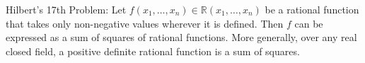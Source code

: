 Hilbert's 17th Problem: Let $f(x_1, \ldots, x_n) \in \mathbb{R}(x_1, \ldots, x_n)$ be a rational function that takes only non-negative values wherever it is defined. Then $f$ can be expressed as a sum of squares of rational functions. More generally, over any real closed field, a positive definite rational function is a sum of squares.
